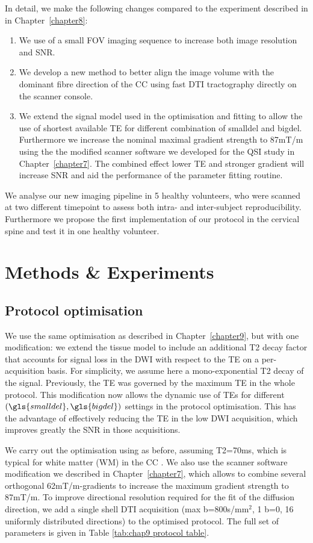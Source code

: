 In detail, we make the following changes compared to the \SFasym{} experiment described in in Chapter~\ref{chapter8}:
\begin{enumerate}
\item We use of a small \gls{FOV} imaging sequence to increase both image resolution and SNR.
\item We develop a new method to better align the image volume with the dominant fibre direction of the CC using fast DTI tractography directly on the scanner console.
\item We extend the signal model used in the optimisation and fitting to allow the use of shortest available \gls{TE} for different combination of \gls{smalldel} and \gls{bigdel}. Furthermore we increase the nominal maximal gradient strength to 87mT/m using the the modified scanner software we developed for the QSI study in Chapter~\ref{chapter7}. The combined effect lower \gls{TE} and stronger gradient will increase SNR and aid the performance of the parameter fitting routine.
\end{enumerate}
We analyse our new imaging pipeline in 5 healthy volunteers, who were scanned at two different timepoint to assess both intra- and inter-subject reproducibility. Furthermore we propose the first implementation of our \SFasym{} protocol in the cervical spine and test it in one healthy volunteer. 


\section{Methods \& Experiments}
\subsection*{Protocol optimisation}
We use the same \SFasym{} optimisation as described in Chapter~\ref{chapter9}, but with one modification: we extend the tissue model to include an additional T2 decay factor that accounts for signal loss in the DWI with respect to the \gls{TE} on a per-acquisition basis. For simplicity, we assume here a mono-exponential T2 decay of the signal. Previously, the \gls{TE} was governed by the maximum TE in the whole protocol. This modification now allows the dynamic use of \glspl{TE} for different $(\gls{smalldel},\gls{bigdel})$ settings in the protocol optimisation. This has the advantage of effectively reducing the \gls{TE} in the low DWI acquisition, which improves greatly the SNR in those acquisitions.

We carry out the optimisation using as before, assuming T2=70ms, which is typical for white matter (WM) in the CC \citep{}. We also use the scanner software modification we described in Chapter~\ref{chapter7}, which allows to combine several orthogonal 62mT/m-gradients to increase the maximum gradient strength to 87mT/m. To improve directional resolution required for the fit of the diffusion direction, we add a single shell DTI acquisition (max b=800s/mm$^2$, 1 b=0, 16 uniformly distributed directions) to the optimised protocol. The full set of parameters is given in Table \ref{tab:chap9 protocol table}.

